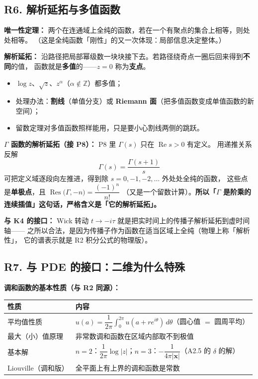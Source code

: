 \subsection{R6. 解析延拓与多值函数}

\textbf{唯一性定理：} 两个在连通域上全纯的函数，若在一个有聚点的集合上相等，则处处相等。
（这是全纯函数「刚性」的又一次体现：局部信息决定整体。）

\textbf{解析延拓：} 沿路径把局部幂级数一块块接下去。若路径绕奇点一圈后回来得到\textbf{不同}的值，
函数就是\textbf{多值}的——$z=0$ 称为\textbf{支点}。

\begin{itemize}
  \item $\log z$、$\sqrt z$、$z^\alpha$（$\alpha\notin\mathbb Z$）都多值；
  \item 处理办法：\textbf{割线}（单值分支）或 \textbf{Riemann 面}（把多值函数变成单值函数的新空间）；
  \item 留数定理对多值函数照样能用，只是要小心割线两侧的跳跃。
\end{itemize}

\textbf{$\Gamma$ 函数的解析延拓（接 P8）：} P8 里 $\Gamma(s)$ 只在 $\operatorname{Re}s>0$ 有定义。
用递推关系反解
\[
\Gamma(s)=\frac{\Gamma(s+1)}{s}
\]
可把定义域逐段向左推进，得到除 $s=0,-1,-2,\dots$ 外处处全纯的函数，
这些点是\textbf{单极点}，且 $\operatorname{Res}\big(\Gamma,-n\big)=\dfrac{(-1)^n}{n!}$
（又是一个留数计算）。\textbf{所以「$\Gamma$ 是阶乘的连续插值」这句话，严格含义是「它的解析延拓」。}

\textbf{与 K4 的接口：} Wick 转动 $t\to-i\tau$ 就是把实时间上的传播子解析延拓到虚时间轴——
之所以合法，是因为传播子作为函数在适当区域上全纯（物理上称「解析性」，
它的谱表示就是 R2 积分公式的物理版）。

\subsection{R7. 与 PDE 的接口：二维为什么特殊}

\textbf{调和函数的基本性质（与 R2 同源）：}

\begin{center}
\begin{tabular}{L{4.0cm}L{10.6cm}}
\toprule
\textbf{性质} & \textbf{内容} \\
\midrule
平均值性质 & $u(a)=\dfrac{1}{2\pi}\displaystyle\int_0^{2\pi}u(a+re^{i\theta})\,d\theta$（圆心值 $=$ 圆周平均） \\
最大（小）值原理 & 非常数调和函数在区域内部取不到极值 \\
基本解 & $n=2$：$\dfrac{1}{2\pi}\log|z|$；$n=3$：$-\dfrac{1}{4\pi|\mathbf x|}$（A2.5 的 $\delta$ 的解） \\
Liouville（调和版） & 全平面上有上界的调和函数是常数 \\
\bottomrule
\end{tabular}
\end{center}

